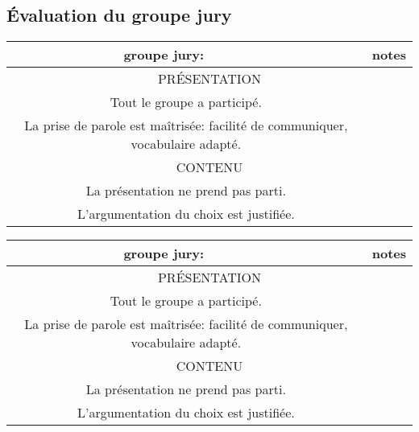 \documentclass[a4paper,11pt]{article}
\begin{document}
\begin{Form}
\begin{commentprof}
\section{Évaluation du groupe jury}
\begin{center}
\begin{tabular}{|c|p{10cm}|c|}
\hline 
groupe jury: &  & notes \\ 
\hline 
\multicolumn{3}{|c|}{PRÉSENTATION}   \\ 
\hline 
\multicolumn{2}{|c|}{Tout le groupe a participé.} &  \\
\hline 
\multicolumn{2}{|c|}{La prise de parole est maîtrisée: facilité de communiquer, vocabulaire adapté.} &  \\
\hline 
\multicolumn{3}{|c|}{CONTENU}   \\ 
\hline 
\multicolumn{2}{|c|}{La présentation ne prend pas parti.} &  \\
\hline 
\multicolumn{2}{|c|}{L’argumentation du choix est justifiée.} &  \\ 
\hline 
\end{tabular}
\end{center}
\begin{center}

\begin{tabular}{|c|p{10cm}|c|}
\hline 
groupe jury: &  & notes \\ 
\hline 
\multicolumn{3}{|c|}{PRÉSENTATION}   \\ 
\hline 
\multicolumn{2}{|c|}{Tout le groupe a participé.} &  \\
\hline 
\multicolumn{2}{|c|}{La prise de parole est maîtrisée: facilité de communiquer, vocabulaire adapté.} &  \\
\hline 
\multicolumn{3}{|c|}{CONTENU}   \\ 
\hline 
\multicolumn{2}{|c|}{La présentation ne prend pas parti.} &  \\
\hline 
\multicolumn{2}{|c|}{L’argumentation du choix est justifiée.} &  \\ 
\hline 
\end{tabular}
\end{center}
\end{commentprof}

\pagebreak
\renewcommand{\arraystretch}{1.4}


\end{Form}
\end{document}
